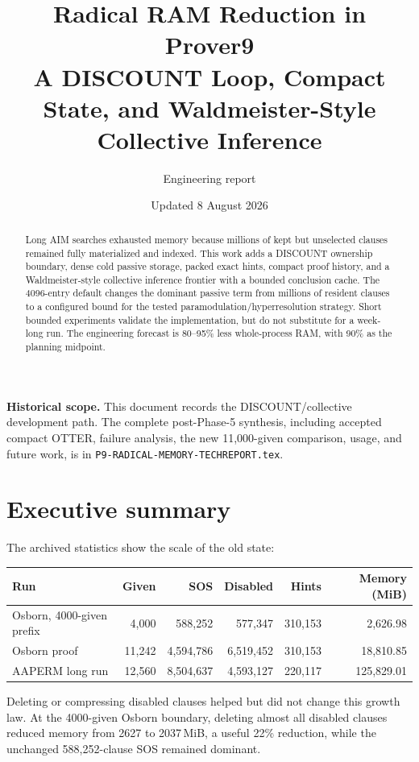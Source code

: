 \documentclass[11pt]{article}
\title{Radical RAM Reduction in Prover9\\
\large A DISCOUNT Loop, Compact State, and Waldmeister-Style Collective Inference}
\author{Engineering report}
\date{Updated 8 August 2026}
\newcommand{\setting}[1]{\texttt{#1}}
\begin{document}
\maketitle

\noindent\textbf{Historical scope.}
This document records the DISCOUNT/collective development path.  The complete
post-Phase-5 synthesis, including accepted compact OTTER, failure analysis, the
new 11,000-given comparison, usage, and future work, is in
\setting{P9-RADICAL-MEMORY-TECHREPORT.tex}.

\begin{abstract}
Long AIM searches exhausted memory because millions of kept but unselected
clauses remained fully materialized and indexed.  This work adds a DISCOUNT
ownership boundary, dense cold passive storage, packed exact hints, compact
proof history, and a Waldmeister-style collective inference frontier with a
bounded conclusion cache.  The 4096-entry default changes the dominant
passive term from millions of resident clauses to a configured bound for the
tested paramodulation/hyperresolution strategy.  Short bounded experiments
validate the implementation, but do not substitute for a week-long run.  The
engineering forecast is 80--95\% less whole-process RAM, with 90\% as the
planning midpoint.
\end{abstract}

\section{Executive summary}

The archived statistics show the scale of the old state:

\begin{center}
\begin{tabular}{lrrrrr}
\toprule
Run & Given & SOS & Disabled & Hints & Memory (MiB) \\
\midrule
Osborn, 4000-given prefix & 4,000 & 588,252 & 577,347 & 310,153 & 2,626.98 \\
Osborn proof              & 11,242 & 4,594,786 & 6,519,452 & 310,153 & 18,810.85 \\
AAPERM long run           & 12,560 & 8,504,637 & 4,593,127 & 220,117 & 125,829.01 \\
\bottomrule
\end{tabular}
\end{center}

Deleting or compressing disabled clauses helped but did not change this growth
law.  At the 4000-given Osborn boundary, deleting almost all disabled clauses
reduced memory from 2627 to 2037\,MiB, a useful 22\% reduction, while the
unchanged 588,252-clause SOS remained dominant.
\end{document}
